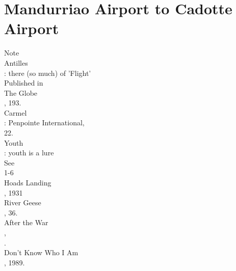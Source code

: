 \documentclass[smalldemyvopaper,11pt,twoside,onecolumn,openright,extrafontsizes]{memoir}
\begin{document}
\chapter{Mandurriao Airport to Cadotte Airport}
Note
\\Antilles
\\: there (so much) of 'Flight'
\\Published in
\\The Globe
\\, 193.
\\Carmel
\\: Penpointe International,
\\22.
\\Youth
\\: youth is a lure
\\See
\\1-6
\\Hoads Landing
\\, 1931
\\River Geese
\\, 36.
\\After the War
\\,
\\.
\\Don't Know Who I Am
\\, 1989.
\end{document}
